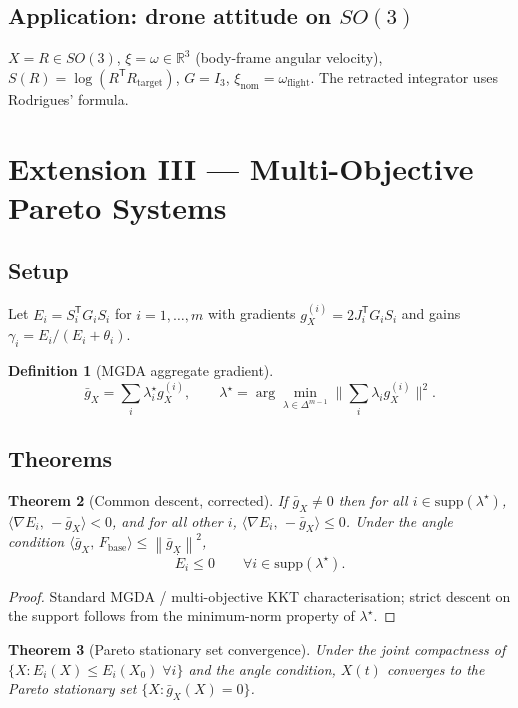 \documentclass[11pt,a4paper]{article}
\newtheorem{theorem}{Theorem}[section]
\theoremstyle{definition}
\newtheorem{definition}[theorem]{Definition}
\newcommand{\Fbase}{F_{\mathrm{base}}}
\newcommand{\R}{\mathbb{R}}
\newcommand{\T}{^{\mathsf{T}}}
\newcommand{\norm}[1]{\left\|#1\right\|}
\newcommand{\inner}[2]{\langle #1,\,#2\rangle}
\newcommand{\supp}{\mathrm{supp}}
\newcommand{\nom}{\mathrm{nom}}
\begin{document}
\subsection{Application: drone attitude on $SO(3)$}

$X = R \in SO(3)$, $\xi = \omega \in \R^3$ (body-frame angular velocity), $S(R) = \log(R\T R_{\mathrm{target}})$, $G = I_3$, $\xi_\nom = \omega_{\mathrm{flight}}$. The retracted integrator uses Rodrigues' formula.

\newpage

\section{Extension III --- Multi-Objective Pareto Systems}

\subsection{Setup}

Let $E_i = S_i\T G_i S_i$ for $i = 1,\dots,m$ with gradients $g_X^{(i)} = 2 J_i\T G_i S_i$ and gains $\gamma_i = E_i/(E_i + \theta_i)$.

\begin{definition}[MGDA aggregate gradient]
\[
\bar g_X = \sum_i \lambda_i^\star g_X^{(i)}, \qquad
\lambda^\star = \arg\min_{\lambda \in \Delta^{m-1}}\Big\|\sum_i \lambda_i g_X^{(i)}\Big\|^2.
\]
\end{definition}

\subsection{Theorems}

\begin{theorem}[Common descent, corrected]
\label{thm:po1}
If $\bar g_X \neq 0$ then for all $i \in \supp(\lambda^\star)$,
$\inner{\nabla E_i}{-\bar g_X} < 0$, and for all other $i$, $\inner{\nabla E_i}{-\bar g_X} \leq 0$. Under the angle condition $\inner{\bar g_X}{\Fbase} \leq \norm{\bar g_X}^2$,
\[
\dot E_i \leq 0 \qquad \forall i \in \supp(\lambda^\star).
\]
\end{theorem}

\begin{proof}
Standard MGDA / multi-objective KKT characterisation; strict descent on the support follows from the minimum-norm property of $\lambda^\star$.
\end{proof}

\begin{theorem}[Pareto stationary set convergence]
\label{thm:po2}
Under the joint compactness of $\{X : E_i(X) \leq E_i(X_0)\;\forall i\}$ and the angle condition, $X(t)$ converges to the Pareto stationary set $\{X : \bar g_X(X) = 0\}$.
\end{theorem}
\end{document}

